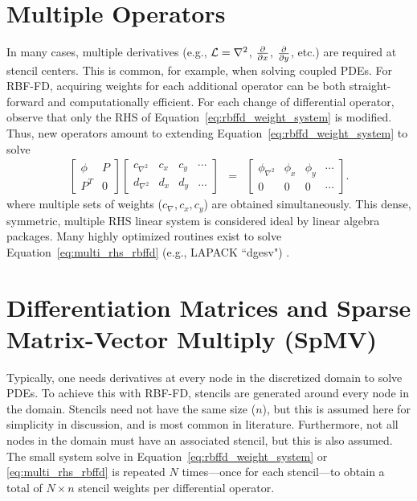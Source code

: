 \documentclass[11pt]{report}
\begin{document}
{\section{Multiple Operators}

In many cases, multiple derivatives (e.g., $\mathcal{L} = \nabla^2$, $\frac{\partial }{\partial x}$, $\frac{\partial }{\partial y}$, etc.) are required at stencil centers. This is common, for example, when solving coupled PDEs. For RBF-FD, acquiring weights for each additional operator can be both straight-forward and computationally efficient. For each change of differential operator, observe that only the RHS of Equation~\ref{eq:rbffd_weight_system} is modified. Thus, new operators amount to extending Equation~\ref{eq:rbffd_weight_system} to solve 
\begin{eqnarray}
    \begin{bmatrix} \phi & P \\
		P^T & 0 \end{bmatrix} \begin{bmatrix} c_{\nabla^2} & c_{x} & c_{y} & \cdots \\ 
							d_{\nabla^2} & d_{x} & d_{y} & \dots \end{bmatrix} & = &     
		\begin{bmatrix} \phi_{\nabla^2} & \phi_{x} & \phi_{y} & \cdots \\
							0 & 0 & 0 & \cdots \end{bmatrix}. \label{eq:multi_rhs_rbffd}
	\end{eqnarray}
where multiple sets of weights ($c_\nabla, c_x, c_y$) are obtained simultaneously. This dense, symmetric, multiple RHS linear system is considered ideal by linear algebra packages. Many highly optimized routines exist to solve Equation~\ref{eq:multi_rhs_rbffd} (e.g., LAPACK ``dgesv") \cite{Lapack1999}. 



\section{Differentiation Matrices and Sparse Matrix-Vector Multiply (SpMV)}


Typically, one needs derivatives at every node in the discretized domain to solve PDEs. To achieve this with RBF-FD, stencils are generated around every node in the domain. Stencils need not have the same size ($n$), but this is assumed here for simplicity in discussion, and is most common in literature. Furthermore, not all nodes in the domain must have an associated stencil, but this is also assumed. The small system solve in Equation~\ref{eq:rbffd_weight_system} or \ref{eq:multi_rhs_rbffd}  is repeated $N$ times---once for each stencil---to obtain a total of $N \times n$ stencil weights per differential operator. 

}
\end{document}
